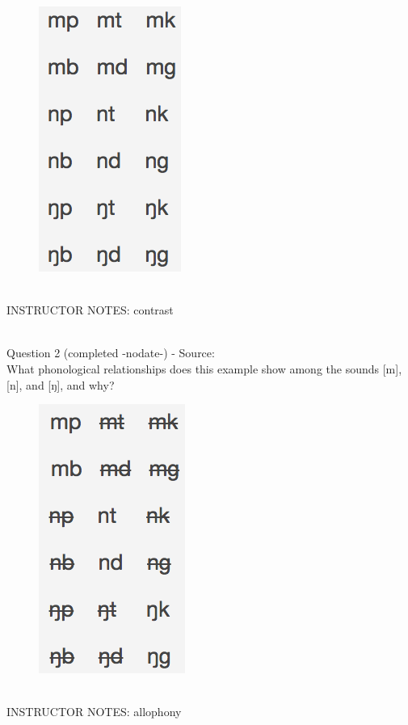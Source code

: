 \documentclass[12pt]{article}
\begin{document}
\begin{figure}[H]
\includegraphics{../images/quiz4question5_a.png}
\end{figure}

~\\
INSTRUCTOR NOTES: contrast


~\\

{\large Question 2} (completed -nodate-) - Source: \\

What phonological relationships does this example show among the sounds [m], [n], and [ŋ], and why?\\

\begin{figure}[H]
\includegraphics{../images/quiz4question5_b.png}
\end{figure}

~\\
INSTRUCTOR NOTES: allophony
\end{document}
